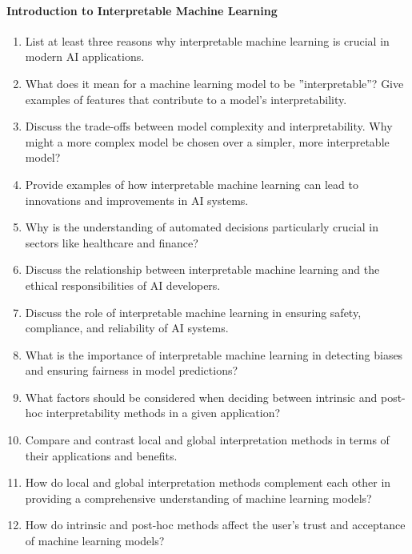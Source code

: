 \paragraph*{Introduction to Interpretable Machine Learning}
\begin{enumerate}[nosep]
    \item List at least three reasons why interpretable machine learning is crucial in modern AI applications.
    \item What does it mean for a machine learning model to be ''interpretable''? Give examples of features that contribute to a model's interpretability.
    \item Discuss the trade-offs between model complexity and interpretability. Why might a more complex model be chosen over a simpler, more interpretable model?
    \item Provide examples of how interpretable machine learning can lead to innovations and improvements in AI systems.
    \item Why is the understanding of automated decisions particularly crucial in sectors like healthcare and finance?
    \item Discuss the relationship between interpretable machine learning and the ethical responsibilities of AI developers.
    \item Discuss the role of interpretable machine learning in ensuring safety, compliance, and reliability of AI systems.
    \item What is the importance of interpretable machine learning in detecting biases and ensuring fairness in model predictions?
    \item What factors should be considered when deciding between intrinsic and post-hoc interpretability methods in a given application?
    \item Compare and contrast local and global interpretation methods in terms of their applications and benefits.
    \item How do local and global interpretation methods complement each other in providing a comprehensive understanding of machine learning models?
    \item How do intrinsic and post-hoc methods affect the user's trust and acceptance of machine learning models?
\end{enumerate}
